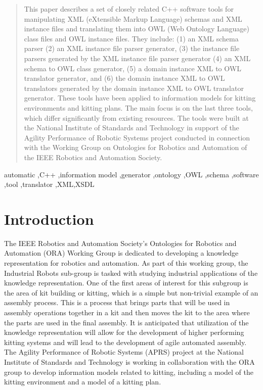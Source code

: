 \documentclass[preprint,12pt]{elsarticle}
\begin{document}
\begin{frontmatter}
\begin{abstract}
This paper describes a set of closely related C++ software tools for
manipulating XML (eXtensible Markup Language) schemas and XML instance
files and translating them into OWL (Web Ontology Language) class files and
OWL instance files. They include: (1) an XML schema parser (2) an XML
instance file parser generator, (3) the instance file parsers generated by
the XML instance file parser generator (4) an XML schema to OWL class
generator, (5) a domain instance XML to OWL translator generator, and (6)
the domain instance XML to OWL translators generated by the domain instance
XML to OWL translator generator. These tools have been applied to
information models for kitting environments and kitting plans. The main
focus is on the last three tools, which differ significantly from existing
resources. The tools were built at the National Institute of Standards and
Technology in support of the Agility Performance of Robotic Systems project
conducted in connection with the Working Group on Ontologies for Robotics
and Automation of the IEEE Robotics and Automation Society.
\end{abstract}

\begin{keyword}
automatic \sep C++ \sep information model \sep generator \sep ontology \sep OWL \sep schema \sep software \sep tool \sep translator \sep XML\sep XSDL

\end{keyword}

\end{frontmatter}


\section{Introduction}
\label{}

The IEEE Robotics and Automation Society's Ontologies for Robotics and
Automation (ORA) Working Group is dedicated to developing a knowledge
representation for robotics and automation. As part of this working group,
the Industrial Robots sub-group is tasked with studying industrial
applications of the knowledge representation. One of the first areas of
interest for this subgroup is the area of kit building or kitting, which is
a simple but non-trivial example of an assembly process. This is a process
that brings parts that will be used in assembly operations together in a
kit and then moves the kit to the area where the parts are used in the
final assembly. It is anticipated that utilization of the knowledge
representation will allow for the development of higher performing kitting
systems and will lead to the development of agile automated assembly. The
Agility Performance of Robotic Systems (APRS) project at the National
Institute of Standards and Technology is working in collaboration with the
ORA group to develop information models related to kitting, including a
model of the kitting environment and a model of a kitting plan.
\end{document}
